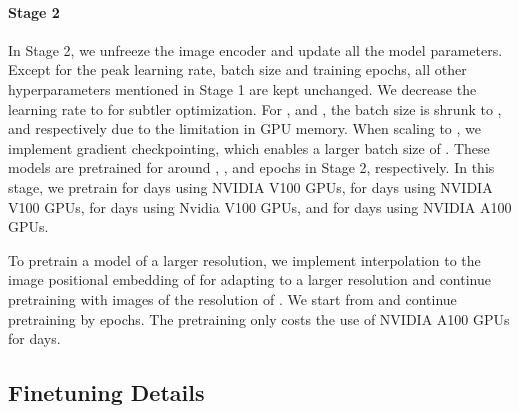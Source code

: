 \documentclass[11pt]{article}
\begin{document}
\paragraph{Stage 2} 
In Stage 2, we unfreeze the image encoder and update all the model parameters. Except for the peak learning rate, batch size and training epochs, all other hyperparameters mentioned in Stage 1 are kept unchanged. We decrease the learning rate to  for subtler optimization. For ,  and , the batch size is shrunk to ,  and  respectively due to the limitation in GPU memory. When scaling to , we implement gradient checkpointing, which enables a larger batch size of . These  models are pretrained for around , ,  and  epochs in Stage 2, respectively.
In this stage, we pretrain  for  days using  NVIDIA V100 GPUs,  for  days using  NVIDIA V100 GPUs,  for  days using  Nvidia V100 GPUs, and  for  days using  NVIDIA A100 GPUs. 

To pretrain a model of a larger resolution, we implement interpolation to the image positional embedding of  for adapting to a larger resolution and continue pretraining with images of the resolution of . 
We start from  and continue pretraining by  epochs. 
The pretraining only costs the use of  NVIDIA A100 GPUs for  days.

\subsection{Finetuning Details}
\end{document}
